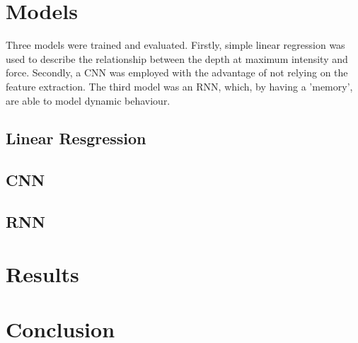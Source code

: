 \documentclass[runningheads,a4paper]{llncs}
\begin{document}
\section{Models}

Three models were trained and evaluated.
Firstly, simple linear regression was used to describe the relationship between the depth at maximum intensity and force.
Secondly, a CNN was employed with the advantage of not relying on the feature extraction.
The third model was an RNN, which, by having a 'memory', are able to model dynamic behaviour.

\subsection{Linear Resgression}\label{sub:linReg}


\subsection{CNN}\label{sub:cnn}


\subsection{RNN}\label{sub:rnn}



\section{Results}\label{sec:results}



\section{Conclusion}\label{sec:conclusion}



\begin{thebibliography}{4}


\end{thebibliography}
\end{document}
